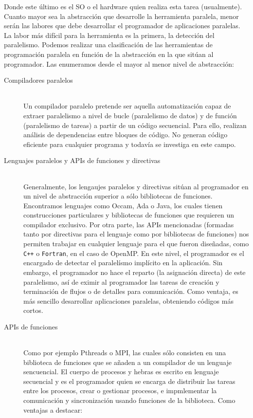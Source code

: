 Donde este último es el SO o el hardware quien realiza esta tarea (usualmente).\\

Cuanto mayor sea la abstracción que desarrolle la herramienta paralela, menor serán las labores que debe desarrollar el programador de aplicaciones paralelas. La labor más difícil para la herramienta es la primera, la detección del paralelismo. Podemos realizar una clasificación de las herramientas de programación paralela en función de la abstracción en la que sitúan al programador. Las enumeramos desde el mayor al menor nivel de abstracción:
\begin{description}
    \item [Compiladores paralelos]~\\
        Un compilador paralelo pretende ser aquella automatización capaz de extraer paralelismo a nivel de bucle (paralelismo de datos) y de función (paralelismo de tareas) a partir de un código secuencial. Para ello, realizan análisis de dependencias entre bloques de código. No generan código eficiente para cualquier programa y todavía se investiga en este campo.
    \item [Lenguajes paralelos y APIs de funciones y directivas]~\\
        Generalmente, los lengaujes paralelos y directivas sitúan al programador en un nivel de abstracción superior a sólo bibliotecas de funciones. Encontramos lenguajes como Occam, Ada o Java, los cuales tienen construcciones particulares y bibliotecas de funciones que requieren un compilador exclusivo. Por otra parte, las APIs mencionadas (formadas tanto por directivas para el lenguaje como por bibliotecas de funciones) nos permiten trabajar en cualquier lenguaje para el que fueron diseñadas, como \verb|C++| o \verb|Fortran|, en el caso de OpenMP. En este nivel, el programador es el encargado de detectar el paralelísmo implícito en la aplicación. Sin embargo, el programador no hace el reparto (la asignación directa) de este paralelismo, así de eximir al programador las tareas de creación y terminación de flujos o de detalles para comunicación. Como ventaja, es más sencillo desarrollar aplicaciones paralelas, obteniendo códigos más cortos.
    \item [APIs de funciones]~\\
        Como por ejemplo Pthreads o MPI, las cuales sólo consisten en una biblioteca de funciones que se añaden a un compilador de un lenguaje sencuencial. El cuerpo de procesos y hebras es escrito en lenguaje secuencial y es el programador quien se encarga de distribuir las tareas entre los procesos, crear o gestionar procesos, e impmlementar la comunicación y sincronización usando funciones de la biblioteca. Como ventajas a destacar:

\end{description}
